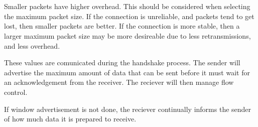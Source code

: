 \section{}

Smaller packets have higher overhead. This should be considered when selecting
the maximum packet size. If the connection is unreliable, and packets tend to
get lost, then smaller packets are better. If the connection is more stable,
then a larger maximum packet size may be more desireable due to less
retransmissions, and less overhead. 

These values are comunicated during the handshake process. The sender will
advertise the maximum amount of data that can be sent before it must wait for an
acknowledgement from the receiver. The reciever will then manage flow control.

If window advertisement is not done, the reciever continually informs the sender
of how much data it is prepared to receive.
